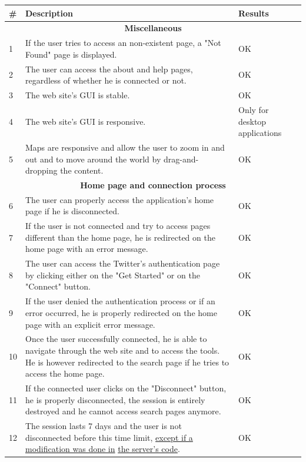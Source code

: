 \documentclass[a4paper,11pt]{report}
\begin{document}
\begin{center}
\def\arraystretch{1.5}
\begin{longtable}{|l|p{10cm}|p{4.4cm}|}\hline
	\textbf{\#} & \textbf{Description} & \textbf{Results}\\\hline \endhead
	\multicolumn{3}{|c|}{\textbf{Miscellaneous}}\\\hline
	1 & If the user tries to access an non-existent page, a "Not Found" page is displayed. & \color{ForestGreen}OK\color{black}\\\hline
	2 & The user can access the about and help pages, regardless of whether he is connected or not. & \color{ForestGreen}OK\color{black}\\\hline
	3 & The web site's GUI is stable. & \color{ForestGreen}OK\color{black}\\\hline
	4 & The web site's GUI is responsive. & \color{Orange}Only for desktop applications\color{black}\\\hline	
	5 & Maps are responsive and allow the user to zoom in and out and to move around the world by drag-and-dropping the content. & \color{ForestGreen}OK\color{black}\\\hline
	
	\multicolumn{3}{|c|}{\textbf{Home page and connection process}}\\\hline
	6 & The user can properly access the application's home page if he is disconnected. & \color{ForestGreen}OK\color{black}\\\hline
	7 & If the user is not connected and try to access pages different than the home page, he is redirected on the home page with an error message. & \color{ForestGreen}OK\color{black}\\\hline
	8 & The user can access the Twitter's authentication page by clicking either on the "Get Started" or on the "Connect" button. & \color{ForestGreen}OK\color{black}\\\hline
	9 & If the user denied the authentication process or if an error occurred, he is properly redirected on the home page with an explicit error message. & \color{ForestGreen}OK\color{black}\\\hline
	10 & Once the user successfully connected, he is able to navigate through the web site and to access the tools. He is however redirected to the search page if he tries to access the home page. & \color{ForestGreen}OK\color{black}\\\hline
	11 & If the connected user clicks on the "Disconnect" button, he is properly disconnected, the session is entirely destroyed and he cannot access search pages anymore. & \color{ForestGreen}OK\color{black}\\\hline
	12 & The session lasts 7 days and the user is not disconnected before this time limit, \underline{except if a modification was done in} \underline{the server's code}. & \color{ForestGreen}OK\color{black}\\\hline
	

\end{longtable}
\end{center}
\end{document}
